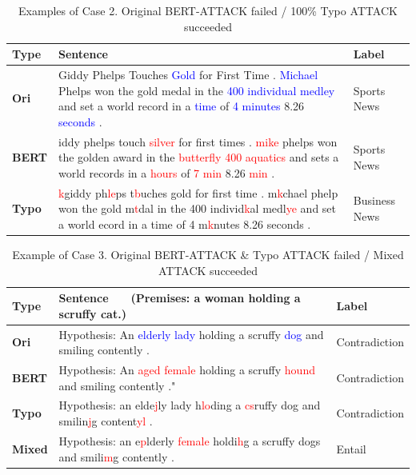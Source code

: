 \documentclass[11pt,a4paper]{article}
\newcommand{\red}[1]{\textcolor{red}{#1}}
\newcommand{\blue}[1]{\textcolor{blue}{#1}}
\begin{document}
{\renewcommand{\arraystretch}{1.5}
\begin{table}[hbt!]
{\small
\begin{tabularx}{\textwidth}{l|X|l}
\hline
\textbf{Type} & \textbf{Sentence}  & \textbf{Label} \\ \hline
\textbf{Ori}  & Giddy Phelps Touches \blue{Gold} for First Time . \blue{Michael} Phelps won the gold medal in the \blue{400 individual medley} and set a world record in a \blue{time} of \blue{4 minutes} 8.26 \blue{seconds} . & Sports News   \\ \hline
\textbf{BERT} & iddy phelps touch \red{silver} for first times . \red{mike} phelps won the golden award in the \red{butterfly 400 aquatics} and sets a world records in a \red{hours} of \red{7 min} 8.26 \red{min} .      & Sports News   \\ \hline
\textbf{Typo} & \red{k}giddy ph\red{le}ps t\red{b}uches gold for first time . m\red{k}chael phelp won the gold m\red{t}dal in the 400 individ\red{k}al medl\red{ye} and set a world ecord in a time of 4 m\red{k}nutes 8.26 seconds .  & Business News \\ \hline
\end{tabularx}
}
\caption{Examples of Case 2. Original BERT-ATTACK failed / 100\% Typo ATTACK succeeded}
\end{table}
}

{\renewcommand{\arraystretch}{1.5}
\begin{table}[hbt!]
{\small
\begin{tabularx}{\textwidth}{l|X|l}
\hline
\textbf{Type} & \textbf{Sentence}$\qquad$(Premises: a woman holding a scruffy cat.) & \textbf{Label} \\ \hline
\textbf{Ori}  & Hypothesis: An \blue{elderly lady} holding a scruffy \blue{dog} and smiling contently .     
& Contradiction \\ \hline
\textbf{BERT}  & Hypothesis: An \red{aged female} holding a scruffy \red{hound} and smiling contently ."    & Contradiction \\ \hline
\textbf{Typo}  & Hypothesis: an elde\red{j}ly lady h\red{lo}ding a \red{cs}ruffy dog and smilin\red{j}g content\red{yl} .    & Contradiction \\ \hline
\textbf{Mixed} & Hypothesis: an e\red{p}lderly \red{female} holdi\red{h}g a scruffy dogs and smili\red{m}g contently . & Entail        \\ \hline
\end{tabularx}
}
\caption{Example of Case 3. Original BERT-ATTACK \& Typo ATTACK failed / Mixed ATTACK succeeded}
\end{table}
}
\end{document}
